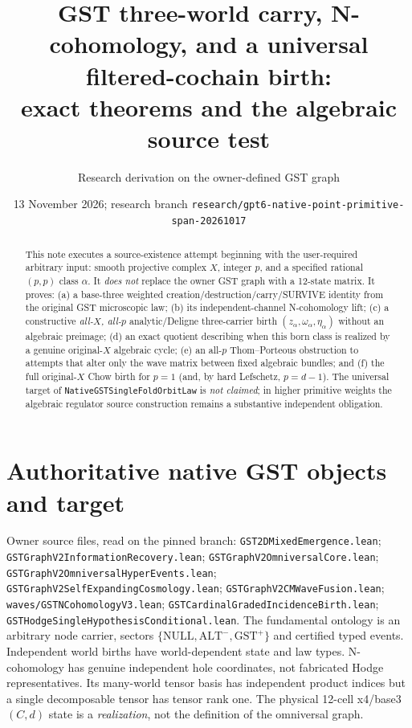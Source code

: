\documentclass[11pt]{article}
\title{GST three-world carry, N-cohomology, and a universal filtered-cochain birth:\\
exact theorems and the algebraic source test}
\author{Research derivation on the owner-defined GST graph}
\date{13 November 2026; research branch \texttt{research/gpt6-native-point-primitive-span-20261017}}
\begin{document}
\maketitle
\begin{abstract}
This note executes a source-existence attempt beginning with the user-required
arbitrary input: smooth projective complex \(X\), integer \(p\), and a specified
rational \((p,p)\) class \(\alpha\). It \emph{does not} replace the owner GST graph
with a 12-state matrix. It proves: (a) a base-three weighted
creation/destruction/carry/SURVIVE identity from the original GST microscopic
law; (b) its independent-channel N-cohomology lift; (c) a constructive
\emph{all-\(X\), all-\(p\)} analytic/Deligne three-carrier birth
\( (z_\alpha,\omega_\alpha,\eta_\alpha)\) without an algebraic preimage;
(d) an exact quotient describing when this born class is realized by a
genuine original-\(X\) algebraic cycle; (e) an all-\(p\) Thom--Porteous
obstruction to attempts that alter only the wave matrix between fixed
algebraic bundles; and (f) the full original-\(X\) Chow birth for \(p=1\)
(and, by hard Lefschetz, \(p=d-1\)).
The universal target of \texttt{NativeGSTSingleFoldOrbitLaw} is
\emph{not claimed}; in higher primitive weights the algebraic regulator
source construction remains a substantive independent obligation.
\end{abstract}

\section{Authoritative native GST objects and target}

Owner source files, read on the pinned branch:
\texttt{GST2DMixedEmergence.lean};
\texttt{GSTGraphV2InformationRecovery.lean};
\texttt{GSTGraphV2OmniversalCore.lean};
\texttt{GSTGraphV2OmniversalHyperEvents.lean};
\texttt{GSTGraphV2SelfExpandingCosmology.lean};
\texttt{GSTGraphV2CMWaveFusion.lean};
\texttt{waves/GSTNCohomologyV3.lean};
\texttt{GSTCardinalGradedIncidenceBirth.lean};
\texttt{GSTHodgeSingleHypothesisConditional.lean}.
The fundamental ontology is an arbitrary node carrier, sectors
\(\{\mathrm{NULL},\mathrm{ALT}^{-},\mathrm{GST}^{+}\}\) and certified typed
events. Independent world births have world-dependent state and law types.
N-cohomology has genuine independent hole coordinates, not fabricated Hodge
representatives. Its many-world tensor basis has independent product
indices but a single decomposable tensor has tensor rank one. The physical
12-cell x4/base3 \((C,d)\) state is a \emph{realization}, not the definition
of the omniversal graph.
\end{document}
